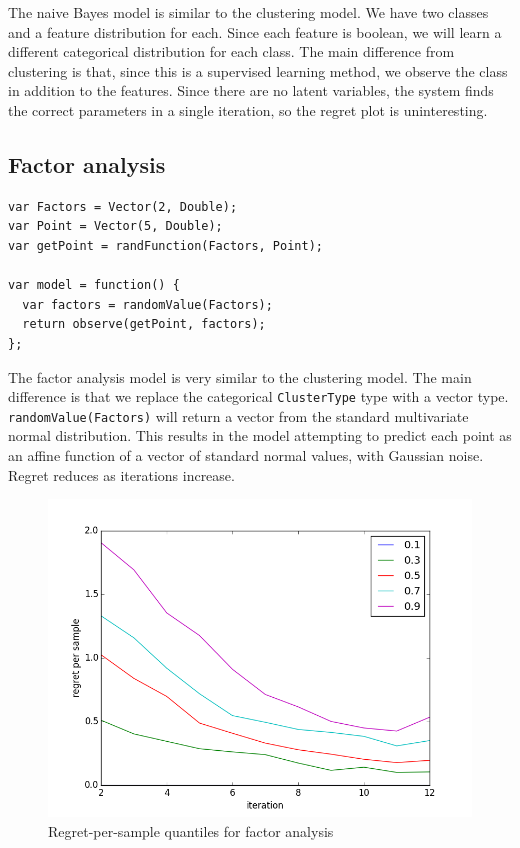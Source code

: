 \documentclass{article}
\begin{document}
The naive Bayes model is similar to the clustering model.  We have two classes and a feature
distribution for each.  Since each feature is boolean, we will learn
a different categorical distribution for each class.  The main difference from clustering is that,
since this is a supervised learning method, we observe the class in addition to the features.  Since there
are no latent variables, the system finds the correct parameters in a single iteration, so the regret plot is uninteresting.

\FloatBarrier
  \subsection{Factor analysis}
{\small
\begin{lstlisting}
var Factors = Vector(2, Double);
var Point = Vector(5, Double);
var getPoint = randFunction(Factors, Point);

var model = function() {
  var factors = randomValue(Factors);
  return observe(getPoint, factors);
};
\end{lstlisting}
}

The factor analysis model is very similar to the clustering model.  The main difference is that we replace the categorical \texttt{ClusterType} type with a vector type.  \texttt{randomValue(Factors)} will return a vector from the standard multivariate normal distribution.  This results in the model attempting to predict each point as an affine function of a vector of standard normal values, with Gaussian noise.  Regret reduces as iterations increase.

  \begin{figure}[h]
\begin{center}
  \includegraphics[scale=0.5]{../plots/accuracy_factor_analysis.png}
\end{center}
\caption{Regret-per-sample quantiles for factor analysis}
\end{figure}
\end{document}

